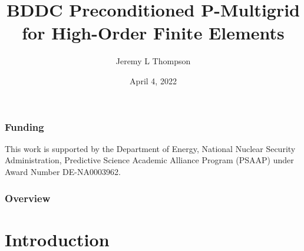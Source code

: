 \documentclass{beamer}
\title[BDDC Preconditioned P-Multigrid]{BDDC Preconditioned P-Multigrid for High-Order Finite Elements} %
\author{Jeremy L Thompson} %
\institute[CU Boulder] %
{University of Colorado, Boulder \\ %
\medskip
\textit{jeremy@jeremylt.org} %
}
\date{April 4, 2022} %
\begin{document}
\begin{frame}
\titlepage %
\end{frame}


\begin{frame}
\begin{center}
\frametitle{Funding}

This work is supported by the Department of Energy, National Nuclear Security Administration, Predictive Science Academic Alliance Program (PSAAP) under Award Number DE-NA0003962.

\end{center}
\end{frame}
 

\begin{frame}
\frametitle{Overview} %
\tableofcontents %
\end{frame}


\section{Introduction}
\end{document}
